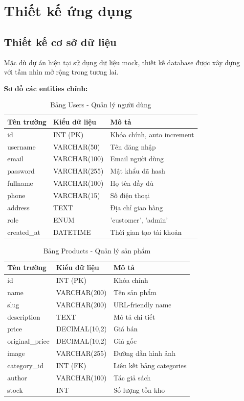 
\section{Thiết kế ứng dụng}

\subsection{Thiết kế cơ sở dữ liệu}

Mặc dù dự án hiện tại sử dụng dữ liệu mock, thiết kế database được xây dựng với tầm nhìn mở rộng trong tương lai.

\textbf{Sơ đồ các entities chính:}

\begin{table}[H]
\centering
\begin{tabular}{|l|l|l|}
\hline
\textbf{Tên trường} & \textbf{Kiểu dữ liệu} & \textbf{Mô tả} \\
\hline
id & INT (PK) & Khóa chính, auto increment \\
username & VARCHAR(50) & Tên đăng nhập \\
email & VARCHAR(100) & Email người dùng \\
password & VARCHAR(255) & Mật khẩu đã hash \\
fullname & VARCHAR(100) & Họ tên đầy đủ \\
phone & VARCHAR(15) & Số điện thoại \\
address & TEXT & Địa chỉ giao hàng \\
role & ENUM & 'customer', 'admin' \\
created\_at & DATETIME & Thời gian tạo tài khoản \\
\hline
\end{tabular}
\caption{Bảng Users - Quản lý người dùng}
\label{tab:users}
\end{table}

\begin{table}[H]
\centering
\begin{tabular}{|l|l|l|}
\hline
\textbf{Tên trường} & \textbf{Kiểu dữ liệu} & \textbf{Mô tả} \\
\hline
id & INT (PK) & Khóa chính \\
name & VARCHAR(200) & Tên sản phẩm \\
slug & VARCHAR(200) & URL-friendly name \\
description & TEXT & Mô tả chi tiết \\
price & DECIMAL(10,2) & Giá bán \\
original\_price & DECIMAL(10,2) & Giá gốc \\
image & VARCHAR(255) & Đường dẫn hình ảnh \\
category\_id & INT (FK) & Liên kết bảng categories \\
author & VARCHAR(100) & Tác giả sách \\
stock & INT & Số lượng tồn kho \\
\hline
\end{tabular}
\caption{Bảng Products - Quản lý sản phẩm}
\label{tab:products}
\end{table}

